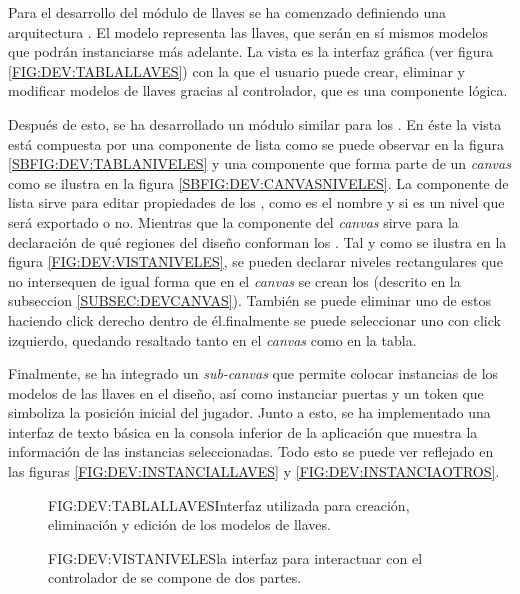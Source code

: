 Para el desarrollo del módulo de llaves se ha comenzado definiendo una arquitectura . El modelo representa las llaves, que serán en sí mismos modelos que podrán instanciarse más adelante. La vista es la interfaz gráfica (ver figura \ref{FIG:DEV:TABLALLAVES}) con la que el usuario puede crear, eliminar y modificar modelos de llaves gracias al controlador, que es una componente lógica.

Después de esto, se ha desarrollado un módulo similar para los . En éste la vista está compuesta por una componente de lista como se puede observar en la figura \ref{SBFIG:DEV:TABLANIVELES} y una componente que forma parte de un \textit{canvas} como se ilustra en la figura \ref{SBFIG:DEV:CANVASNIVELES}.
La componente de lista sirve para editar propiedades de los , como es el nombre y si es un nivel que será exportado o no. Mientras que la componente del \textit{canvas} sirve para la declaración de qué regiones del diseño conforman los .
Tal y como se ilustra en la figura \ref{FIG:DEV:VISTANIVELES}, se pueden declarar niveles rectangulares que no intersequen de igual forma que en el \textit{canvas} se crean los  (descrito en la subseccion \ref{SUBSEC:DEVCANVAS}). También se puede eliminar uno de estos  haciendo click derecho dentro de él.finalmente se puede seleccionar uno con click izquierdo, quedando resaltado tanto en el \textit{canvas} como en la tabla.

Finalmente, se ha integrado un \textit{sub-canvas} que permite colocar instancias de los modelos de las llaves en el diseño, así como instanciar puertas y un token que simboliza la posición inicial del jugador. Junto a esto, se ha implementado una interfaz de texto básica en la consola inferior de la aplicación que muestra la información de las instancias seleccionadas.
Todo esto se puede ver reflejado en las figuras \ref{FIG:DEV:INSTANCIALLAVES} y \ref{FIG:DEV:INSTANCIAOTROS}.

\begin{figure}{FIG:DEV:TABLALLAVES}{Interfaz utilizada para creación, eliminación y edición de los modelos de llaves.}
\end{figure}

\begin{figure}{FIG:DEV:VISTANIVELES}{la interfaz para interactuar con el controlador de  se compone de dos partes.}
	 \quad
\end{figure}

